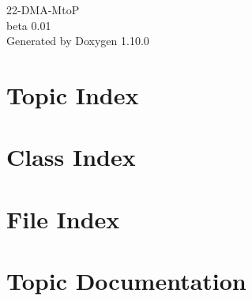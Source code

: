 \documentclass[twoside]{book}
\newcommand{\+}{\discretionary{\mbox{\scriptsize$\hookleftarrow$}}{}{}}
\newcommand{\clearemptydoublepage}{%
    \newpage{\pagestyle{empty}\cleardoublepage}%
  }
\begin{document}
  \raggedbottom
    \hypersetup{pageanchor=false,
                bookmarksnumbered=true,
                pdfencoding=unicode
               }
  \begin{titlepage}
  \vspace*{7cm}
  \begin{center}%
  {\Large 22-\/\+DMA-\/\+MtoP}\\
  [1ex]\large beta 0.\+01 \\
  \vspace*{1cm}
  {\large Generated by Doxygen 1.10.0}\\
  \end{center}
  \end{titlepage}
  \clearemptydoublepage
  \tableofcontents
  \clearemptydoublepage
  \hypersetup{pageanchor=true}

\chapter{Topic Index}

\chapter{Class Index}

\chapter{File Index}

\chapter{Topic Documentation}





\end{document}
